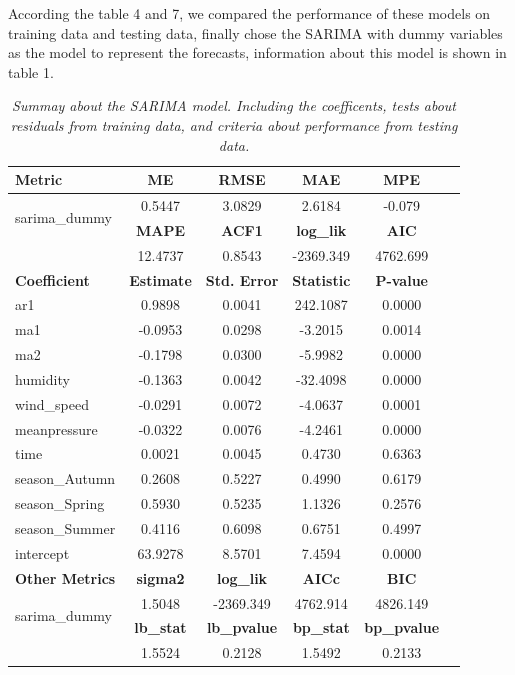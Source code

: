 \documentclass[12pt]{article}
\begin{document}
According the table 4 and 7, we compared the performance of these models on
training data and testing data, finally chose the SARIMA with dummy variables
as the model to represent the forecasts, information about this model is shown 
in table 1.
\begin{table}[!h]
    \centering
    \captionsetup{font=small} %
    \caption{\textit{Summay about the SARIMA model.
    Including the coefficents, tests about residuals from training data,
    and criteria about performance from testing data.}}
    \label{tab:model_summary_combined}
    \begin{tabular}{lccccc}
    \toprule
    \textbf{Metric} & \textbf{ME} & \textbf{RMSE} & \textbf{MAE} & \textbf{MPE} \\
    \midrule
    \multirow{2}{*}{sarima\_dummy} 
        & 0.5447 & 3.0829 & 2.6184 & -0.079 \\
        \cmidrule{2-5}
        & \textbf{MAPE} & \textbf{ACF1} & \textbf{log\_lik} & \textbf{AIC} \\
    \cmidrule{2-5}
        & 12.4737 & 0.8543 & -2369.349 & 4762.699 \\
    \midrule
    \textbf{Coefficient} & \textbf{Estimate} & \textbf{Std. Error} & \textbf{Statistic} & \textbf{P-value} \\
    \cmidrule{1-5}
    ar1            & 0.9898  & 0.0041 & 242.1087 & 0.0000 \\
    ma1            & -0.0953 & 0.0298 & -3.2015  & 0.0014 \\
    ma2            & -0.1798 & 0.0300 & -5.9982  & 0.0000 \\
    humidity       & -0.1363 & 0.0042 & -32.4098 & 0.0000 \\
    wind\_speed    & -0.0291 & 0.0072 & -4.0637  & 0.0001 \\
    meanpressure   & -0.0322 & 0.0076 & -4.2461  & 0.0000 \\
    time           & 0.0021  & 0.0045 & 0.4730   & 0.6363 \\
    season\_Autumn & 0.2608  & 0.5227 & 0.4990   & 0.6179 \\
    season\_Spring & 0.5930  & 0.5235 & 1.1326   & 0.2576 \\
    season\_Summer & 0.4116  & 0.6098 & 0.6751   & 0.4997 \\
    intercept      & 63.9278 & 8.5701 & 7.4594   & 0.0000 \\
    \midrule
    \textbf{Other Metrics} & \textbf{sigma2} & \textbf{log\_lik} & \textbf{AICc} & \textbf{BIC} \\
    \cmidrule{1-5}
    \multirow{2}{*}{sarima\_dummy} & 1.5048 & -2369.349 & 4762.914 & 4826.149  \\
    \cmidrule{2-5}
     & \textbf{lb\_stat} & \textbf{lb\_pvalue} & \textbf{bp\_stat} & \textbf{bp\_pvalue} \\
     \cmidrule{2-5}
     & 1.5524 & 0.2128 & 1.5492 & 0.2133 \\
    \bottomrule
    \end{tabular}
\end{table}
\end{document}
